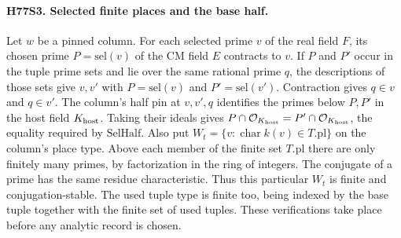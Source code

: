 \paragraph{H77S3. Selected finite places and the base half.}
Let $w$ be a pinned column. For each selected prime $v$ of the real
field $F$, its chosen prime $P=\mathrm{sel}(v)$ of the CM field $E$
contracts to $v$. If $P$ and $P'$ occur in the tuple prime sets and
lie over the same rational prime $q$, the descriptions of those sets
give $v,v'$ with $P=\mathrm{sel}(v)$ and $P'=\mathrm{sel}(v')$.
Contraction gives $q\in v$ and $q\in v'$. The column's half pin at
$v,v',q$ identifies the primes below $P,P'$ in the host field
$K_{\rm host}$. Taking their ideals gives
$P\cap\mathcal O_{K_{\rm host}}=P'\cap\mathcal O_{K_{\rm host}}$,
the equality required by $\mathrm{SelHalf}$.
Also put $W_t=\{v:\operatorname{char} k(v)\in T.\mathrm{pl}\}$
on the column's place type. Above each member of the finite set
$T.\mathrm{pl}$ there are only finitely many primes, by factorization
in the ring of integers. The conjugate of a prime has the same
residue characteristic. Thus this particular $W_t$ is finite and
conjugation-stable. The used tuple type is finite too, being indexed
by the base tuple together with the finite set of used tuples.
These verifications take place before any analytic record is chosen.
